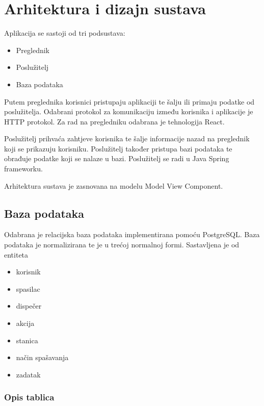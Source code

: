 \chapter{Arhitektura i dizajn sustava}

	Aplikacija se sastoji od tri podsustava:
	
		\begin{itemize}
			\item Preglednik
			\item Poslužitelj
			\item Baza podataka
		\end{itemize}
	
	Putem preglednika korisnici pristupaju aplikaciji te šalju ili primaju podatke od poslužitelja. Odabrani protokol za komunikaciju između korisnika i aplikacije je HTTP protokol. Za rad na pregledniku odabrana je tehnologija React.
	
	Poslužitelj prihvaća zahtjeve korisnika te šalje informacije nazad na preglednik koji se prikazuju korisniku. Poslužitelj također pristupa bazi podataka te obrađuje podatke koji se nalaze u bazi. Poslužitelj se radi u Java Spring frameworku.
	
	Arhitektura sustava je zasnovana na modelu Model View Component.
	
	
	
	
	
	
	\section{Baza podataka}
		
		
	Odabrana je relacijska baza podataka implementirana pomoću PostgreSQL. Baza podataka je normalizirana te je u trećoj normalnoj formi. Sastavljena je od entiteta
			\begin{itemize}
				\item korisnik
				\item spasilac
				\item dispečer
				\item akcija
				\item stanica
				\item način spašavanja
				\item zadatak
			\end{itemize}
		
			\subsection{Opis tablica}
			
